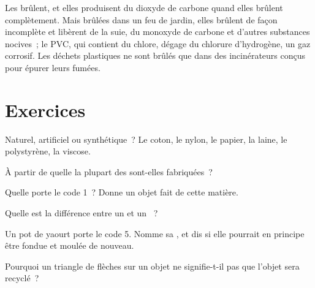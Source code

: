 \begin{remark}\label{rem:g8:plastics:burning}
Les  brûlent, et elles produisent du dioxyde de
carbone quand elles brûlent complètement. Mais brûlées dans un feu de
jardin, elles brûlent de façon incomplète et libèrent de la suie, du
monoxyde de carbone et d'autres substances nocives~; le PVC, qui
contient du chlore, dégage du chlorure d'hydrogène, un gaz corrosif. Les
déchets plastiques ne sont brûlés que dans des incinérateurs conçus
pour épurer leurs fumées.
\end{remark}

\section{Exercices}

\begin{exercise}[$\star$]\label{exo:g8:plastics:1}
Naturel, artificiel ou synthétique~? Le coton, le nylon, le papier, la
laine, le polystyrène, la viscose.
\end{exercise}

\begin{exercise}[$\star$]\label{exo:g8:plastics:2}
À partir de quelle  la plupart des 
sont-elles fabriquées~?
\end{exercise}

\begin{exercise}[$\star$]\label{exo:g8:plastics:3}
Quelle  porte le code 1~? Donne un objet fait de cette
matière.
\end{exercise}

\begin{exercise}[$\star$]\label{exo:g8:plastics:4}
Quelle est la différence entre un  et un
~?
\end{exercise}

\begin{exercise}[$\star\star$]\label{exo:g8:plastics:5}
Un pot de yaourt porte le code 5. Nomme sa , et dis si
elle pourrait en principe être fondue et moulée de nouveau.
\end{exercise}

\begin{exercise}[$\star\star$]\label{exo:g8:plastics:6}
Pourquoi un triangle de flèches sur un objet ne signifie-t-il pas que
l'objet sera recyclé~?
\end{exercise}

